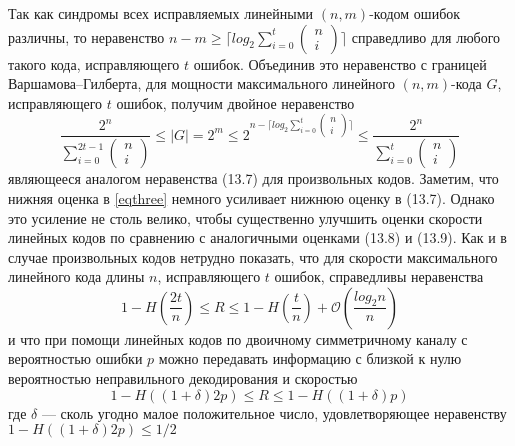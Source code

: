 \documentclass[12pt]{article}
\numberwithin{equation}{section}
\begin{document}
	Так как синдромы всех исправляемых линейными $(n,m)$-кодом ошибок различны, то неравенство 
	$n-m \ge \lceil log_2 \sum_{i=0}^t 
	\begin{pmatrix}
		n \\ i
	\end{pmatrix} \rceil$ 
	справедливо для любого такого кода, исправляющего $t$ ошибок. Объединив это неравенство с границей 
	Варшамова–Гилберта, для мощности максимального линейного $(n, m)$-кода
	$G$, исправляющего $t$ ошибок, получим двойное неравенство
	\begin{equation}\label{eqthree}
		\frac{2^n}{\sum_{i=0}^{2t-1}
		\begin{pmatrix}
			n \\ i
		\end{pmatrix}}
		\le |G| = 2^m \le 2^{n-\lceil log_2\sum_{i=0}^{t}
		\begin{pmatrix}
			n \\ i
		\end{pmatrix}\rceil}\le \frac{2^n}{\sum_{i=0}^{t}
		\begin{pmatrix}
			n \\ i
		\end{pmatrix}}
	\end{equation}
	являющееся аналогом неравенства (13.7) для произвольных кодов. Заметим, что нижняя оценка в 
	\ref{eqthree} немного усиливает нижнюю оценку в (13.7). Однако это усиление не столь велико, чтобы 
	существенно	улучшить оценки скорости линейных кодов по сравнению с аналогичными оценками (13.8) и 
	(13.9). Как и в случае произвольных кодов нетрудно показать, что для скорости максимального линейного 
	кода длины $n$, исправляющего $t$ ошибок, справедливы неравенства
	\begin{equation}\label{eqfour}
		1-H\left(\frac{2t}{n}\right)\le R\le 1-H\left(\frac{t}{n}\right)+\mathcal{O}\left(\frac{log_2 
		n}{n}\right)
	\end{equation}
	и что при помощи линейных кодов по двоичному симметричному каналу с вероятностью ошибки $p$ можно 
	передавать информацию с близкой к нулю вероятностью неправильного декодирования и скоростью
	\begin{equation}
	1-H((1+\delta)2p)\le R\le 1-H((1+\delta)p)
	\end{equation}
	где $\delta$ --- сколь угодно малое положительное число, удовлетворяющее неравенству  
	$1-H((1+\delta)2p)\le 1/2$
\end{document}
